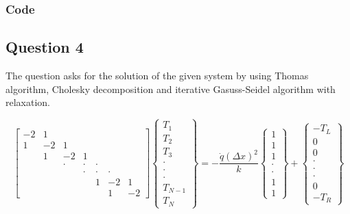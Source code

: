 \documentclass[12pt, a4paper]{article}
\begin{document}
\subsubsection{Code}





\newpage
\subsection{Question 4}
The question asks for the solution of the given system by using Thomas algorithm, Cholesky decomposition and iterative Gasuss-Seidel algorithm with relaxation.

\begin{equation}
\begin{bmatrix}
-2 & 1 &  &  &  &  &  \\
1 & -2 & 1 &  &  & &  \\
 & 1 & -2 & 1 &  &  &  \\
 &  & \cdot & \cdot & \cdot &  &  \\
 &  &  & \cdot & \cdot & \cdot &  \\
 &  &  &  & 1 & -2 & 1 \\
 &  &  &  &  & 1 & -2
\end{bmatrix}
\left\{\begin{array}{c}
T_{1} \\
T_{2} \\
T_{3} \\
\cdot \\
\cdot \\
\cdot \\
T_{N-1} \\
T_{N}
\end{array}\right\}=-\frac{\dot{q}(\Delta x)^{2}}{k}\left\{\begin{array}{l}
1 \\
1 \\
1 \\
\cdot \\
\cdot \\
1 \\
1
\end{array}\right\}+\left\{\begin{array}{c}
-T_{L} \\
0 \\
0 \\
\cdot \\
\cdot \\
\cdot \\
0 \\
-T_{R}
\end{array}\right\}
\end{equation}
\end{document}
